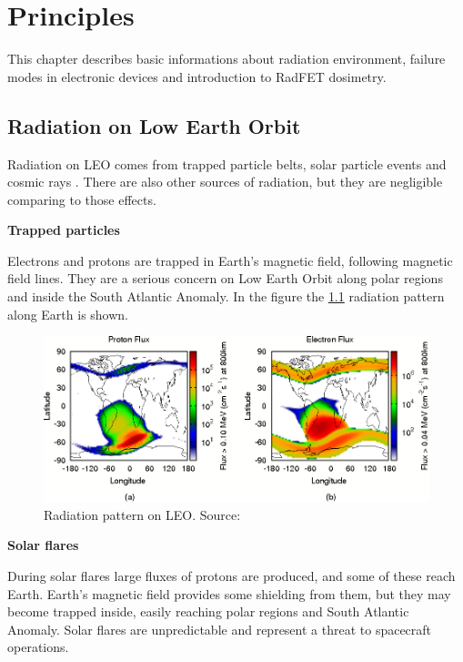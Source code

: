 \chapter{Principles}

This chapter describes basic informations about radiation environment, failure modes in electronic devices and introduction to RadFET dosimetry.

\section{Radiation on Low Earth Orbit}
    Radiation on LEO comes from trapped particle belts, solar particle events and cosmic rays \cite{ESA_radiation}. There are also other sources of radiation, but they are negligible comparing to those effects.

    \bigskip \textbf{Trapped particles}

    Electrons and protons are trapped in Earth's magnetic field, following magnetic field lines. They are a serious concern on Low Earth Orbit along polar regions and inside the South Atlantic Anomaly. In the figure the \ref{Polar_SAA} radiation pattern along Earth is shown.

    \begin{figure}[H]
        \centering
        \includegraphics[width=0.8\paperwidth]{img/03/polar_SAA.png}
        \caption{Radiation pattern on LEO. Source: \cite{ESA_radiation}}
         \label{Polar_SAA}
    \end{figure}

    \newpage
    \bigskip \textbf{Solar flares}

    During solar flares large fluxes of protons are produced, and some of these reach Earth. Earth's magnetic field provides some shielding from them, but they may become trapped inside, easily reaching polar regions and South Atlantic Anomaly. Solar flares are unpredictable and represent a threat to spacecraft operations.

